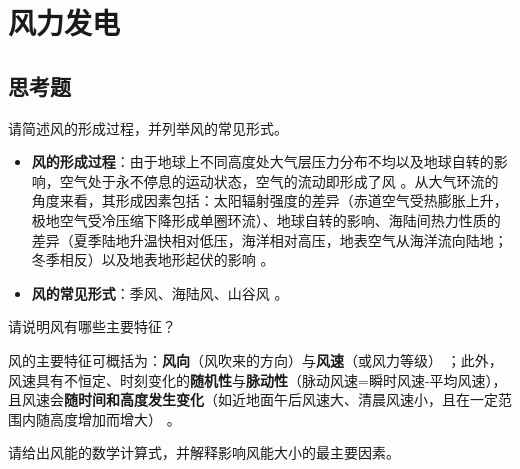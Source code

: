 \chapter{风力发电}

\section{思考题}

\begin{problem}\label{exer:think_03_wind_01}
请简述风的形成过程，并列举风的常见形式。
\end{problem}

\begin{solution}
\begin{itemize}
\item \textbf{风的形成过程}：由于地球上不同高度处大气层压力分布不均以及地球自转的影响，空气处于永不停息的运动状态，空气的流动即形成了风 。从大气环流的角度来看，其形成因素包括：太阳辐射强度的差异（赤道空气受热膨胀上升，极地空气受冷压缩下降形成单圈环流）、地球自转的影响、海陆间热力性质的差异（夏季陆地升温快相对低压，海洋相对高压，地表空气从海洋流向陆地；冬季相反）以及地表地形起伏的影响 。
\item \textbf{风的常见形式}：季风、海陆风、山谷风 。
\end{itemize}
\end{solution}

\begin{problem}\label{exer:think_03_wind_02}
请说明风有哪些主要特征？
\end{problem}

\begin{solution}
风的主要特征可概括为：\textbf{风向}（风吹来的方向）与\textbf{风速}（或风力等级） ；此外，风速具有不恒定、时刻变化的\textbf{随机性}与\textbf{脉动性}（脉动风速=瞬时风速-平均风速），且风速会\textbf{随时间和高度发生变化}（如近地面午后风速大、清晨风速小，且在一定范围内随高度增加而增大） 。
\end{solution}

\begin{problem}\label{exer:think_03_wind_03}
请给出风能的数学计算式，并解释影响风能大小的最主要因素。
\end{problem}

